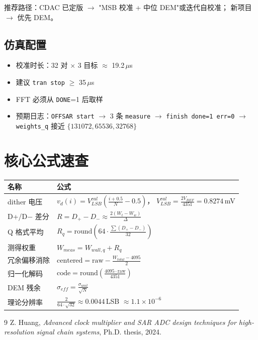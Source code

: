 \documentclass[UTF8,a4paper,11pt,twoside]{ctexrep}
\begin{document}
推荐路径：CDAC 已定版 $\to$ "MSB 校准 + 中位 DEM"或迭代自校准；
新项目 $\to$ 优先 DEM。

\section{仿真配置}

\begin{itemize}
\item 校准时长：32 对 $\times$ 3 目标 $\approx$ 19.2\,$\mu$s
\item 建议 \texttt{tran stop} $\geq$ 35\,$\mu$s
\item FFT 必须从 \texttt{DONE}=1 后取样
\item 预期日志：\texttt{OFFSAR start} $\to$ 3 条 \texttt{measure}
      $\to$ \texttt{finish done=1 err=0}
      $\to$ \texttt{weights\_q} 接近 $\{131072, 65536, 32768\}$
\end{itemize}

\appendix
\chapter{核心公式速查}

\footnotesize
\begin{longtable}{p{4.0cm}p{9.0cm}}
\toprule
\textbf{名称} & \textbf{公式} \\
\hline
\endhead
dither 电压 & $v_d(i)=V_{LSB}^{cal}\!\left(\frac{i+0.5}{N}-0.5\right)$，
              $V_{LSB}^{cal}=\frac{2V_{REF}}{4351}=0.8274$\,mV \\
D+/D$-$ 差分 & $R=D_+-D_-\approx\frac{2(W_t-W_w)}{\Delta}$ \\
Q 格式平均 & $R_q=\mathrm{round}\!\left(64\cdot\frac{\sum(D_+-D_-)}{32}\right)$ \\
测得权重 & $W_{meas}=W_{wall,q}+R_q$ \\
冗余偏移消除 & $\text{centered}=\text{raw}-\frac{W_{total}-4095}{2}$ \\
归一化解码 & $\text{code}=\mathrm{round}\!\left(\frac{4095\cdot\text{raw}}{4351}\right)$ \\
DEM 残余 & $\sigma_{eff}=\frac{\sigma_{unit}}{\sqrt{N}}$ \\
理论分辨率 & $\frac{2}{64\cdot\sqrt{32}}\approx 0.0044$\,LSB $\approx 1.1\times10^{-6}$ \\
\bottomrule
\end{longtable}

\begin{thebibliography}{9}
 Z. Huang, \textit{Advanced clock multiplier and SAR ADC
  design techniques for high-resolution signal chain systems}, Ph.D. thesis,
  2024.
\end{thebibliography}
\end{document}
